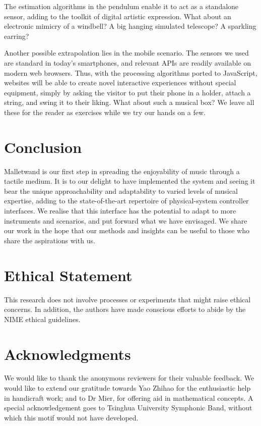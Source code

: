 \documentclass{nime-alternate} %
\begin{document}
The estimation algorithms in the pendulum enable it to act as a standalone sensor, adding to the toolkit of digital artistic expression. What about an electronic mimicry of a windbell? A big hanging simulated telescope? A sparkling earring?

Another possible extrapolation lies in the mobile scenario. The sensors we used are standard in today's smartphones, and relevant APIs are readily available on modern web browsers. Thus, with the processing algorithms ported to JavaScript, websites will be able to create novel interactive experiences without special equipment, simply by asking the visitor to put their phone in a holder, attach a string, and swing it to their liking. What about such a musical box? We leave all these for the reader as exercises while we try our hands on a few.

\section{Conclusion}
Malletwand is our first step in spreading the enjoyability of music through a tactile medium. It is to our delight to have implemented the system and seeing it bear the unique approachability and adaptability to varied levels of musical expertise, adding to the state-of-the-art repertoire of physical-system controller interfaces. We realise that this interface has the potential to adapt to more instruments and scenarios, and put forward what we have envisaged. We share our work in the hope that our methods and insights can be useful to those who share the aspirations with us.

\section{Ethical Statement}
This research does not involve processes or experiments that might raise ethical concerns. In addition, the authors have made conscious efforts to abide by the NIME ethical guidelines.

\section{Acknowledgments}
We would like to thank the anonymous reviewers for their valuable feedback. We would like to extend our gratitude towards Yao Zhihao for the enthusiastic help in handicraft work; and to Dr Mier, for offering aid in mathematical concepts. A special acknowledgement goes to Tsinghua University Symphonic Band, without which this motif would not have developed.
\end{document}
